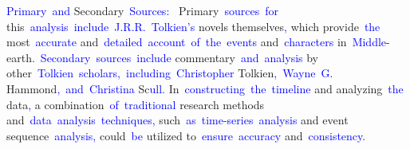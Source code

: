 \documentclass{article}
\begin{document}
\begin{tcolorbox}[colframe=black,colback=white]
{}\textcolor{blue}{Primary}\textcolor{blue}{~and} Secondary\textcolor{blue}{~Sources}\textcolor{blue}{:}\textcolor{blue}{~
}Primary\textcolor{blue}{~sources}\textcolor{blue}{~for} this\textcolor{blue}{~analysis}\textcolor{blue}{~include}\textcolor{blue}{~J}\textcolor{blue}{.R}\textcolor{blue}{.R}\textcolor{blue}{.}\textcolor{blue}{~Tolkien}\textcolor{blue}{'s} novels themselves\textcolor{blue}{,} which provide\textcolor{blue}{~the} most\textcolor{blue}{~accurate} and\textcolor{blue}{~detailed}\textcolor{blue}{~account}\textcolor{blue}{~of}\textcolor{blue}{~the}\textcolor{blue}{~events} and\textcolor{blue}{~characters} in\textcolor{blue}{~Middle}-earth\textcolor{blue}{.}\textcolor{blue}{~Secondary}\textcolor{blue}{~sources}\textcolor{blue}{~include} commentary\textcolor{blue}{~and}\textcolor{blue}{~analysis} by other\textcolor{blue}{~Tolkien}\textcolor{blue}{~scholars}\textcolor{blue}{,}\textcolor{blue}{~including}\textcolor{blue}{~Christopher} Tolkien\textcolor{blue}{,}\textcolor{blue}{~Wayne}\textcolor{blue}{~G}\textcolor{blue}{.} Hammond\textcolor{blue}{,}\textcolor{blue}{~and}\textcolor{blue}{~Christina} Sc\textcolor{blue}{ull}\textcolor{blue}{.} In\textcolor{blue}{~constructing}\textcolor{blue}{~the}\textcolor{blue}{~timeline} and analyzing\textcolor{blue}{~the} data\textcolor{blue}{,} a combination\textcolor{blue}{~of}\textcolor{blue}{~traditional} research methods and\textcolor{blue}{~data}\textcolor{blue}{~analysis}\textcolor{blue}{~techniques}\textcolor{blue}{,} such\textcolor{blue}{~as}\textcolor{blue}{~time}\textcolor{blue}{-series}\textcolor{blue}{~analysis} and event sequence\textcolor{blue}{~analysis}\textcolor{blue}{,} could\textcolor{blue}{~be} utilized to\textcolor{blue}{~ensure}\textcolor{blue}{~accuracy} and\textcolor{blue}{~consistency}\textcolor{blue}{.}\textcolor{blue}{}
\end{tcolorbox}
\end{document}
